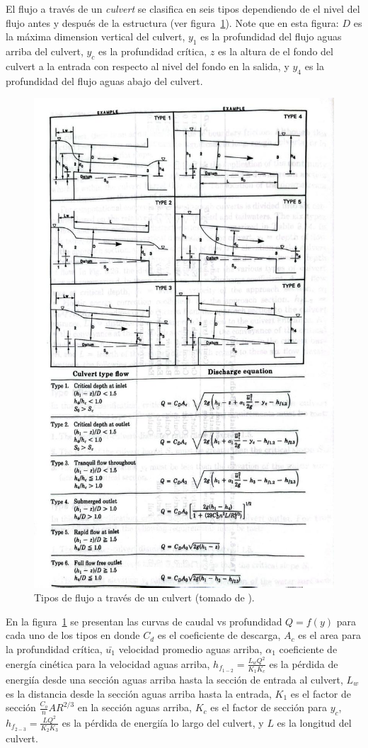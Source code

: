 \documentclass[11pt, oneside]{article}
\begin{document}
El flujo a trav\'es de un \emph{culvert} se clasifica en seis tipos dependiendo de el nivel del flujo antes y despu\'es de la estructura (ver figura~\ref{fig826}). Note que en esta figura: $D$ es la m\'axima dimension vertical del culvert, $y_1$ es la profundidad del flujo aguas arriba del culvert, $y_c$ es la profundidad cr\'itica, $z$ es la altura de el fondo del culvert a la entrada con respecto al nivel del fondo en la salida, y $y_4$ es la profundidad del flujo aguas abajo del culvert. 
\begin{figure}[h]
    \centering
    \includegraphics[width=0.8\linewidth]{fig826.jpeg}
    \caption{Tipos de flujo a trav\'es de un culvert (tomado de \cite{French}).}
    \label{fig826}
\end{figure}

En la figura~\ref{fig826} se presentan las curvas de caudal vs profundidad $Q=f(y)$ para cada uno de los tipos en donde $C_d$ es el coeficiente de descarga, $A_c$ es el area para la profundidad cr\'itica, $\bar{u_1}$ velocidad promedio aguas arriba, $\alpha_1$ coeficiente de energ\'ia cin\'etica para la velocidad aguas arriba, $h_{f_{1-2}} = \frac{L_w Q^2}{K_1 K_c}$ es la p\'erdida de energi\'ia desde una secci\'on aguas arriba hasta la secci\'on de entrada al culvert, $L_w$ es la distancia desde la secci\'on aguas arriba hasta la entrada, $K_1$ es el factor de secci\'on $\frac{C_o}{n} A R^{2/3}$ en la secci\'on aguas arriba, $K_c$ es el factor de secci\'on para $y_c$, $h_{f_{2-3}} = \frac{L Q^2}{K_2 K_3}$ es la p\'erdida de energi\'ia lo largo del culvert, y $L$ es la longitud del culvert. 
\end{document}
